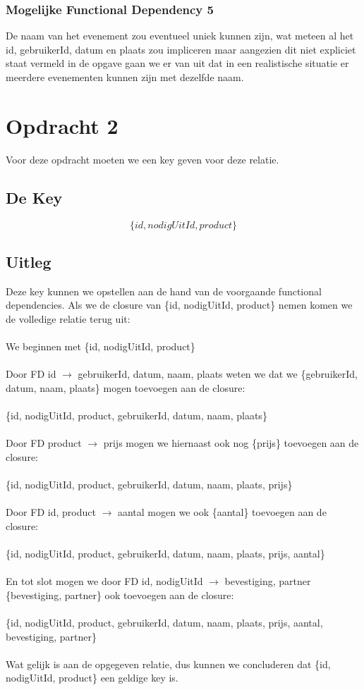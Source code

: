 \documentclass[a4paper]{article}
\begin{document}
\subsubsection{Mogelijke Functional Dependency 5}
De naam van het evenement zou eventueel uniek kunnen zijn, wat meteen al het id, gebruikerId, datum en plaats zou impliceren maar aangezien dit niet expliciet staat vermeld in de opgave gaan we er van uit dat in een realistische situatie er meerdere evenementen kunnen zijn met dezelfde naam.

\section{Opdracht 2}
Voor deze opdracht moeten we een key geven voor deze relatie.
\subsection{De Key}
\[\{id, nodigUitId, product\}\]
\newpage
\subsection{Uitleg}
Deze key kunnen we opstellen aan de hand van de voorgaande functional dependencies.
Als we de closure van \{id, nodigUitId, product\} nemen komen we de volledige relatie terug uit:\\\\
We beginnen met \{id, nodigUitId, product\}\\\\
Door FD id $\rightarrow$ gebruikerId, datum, naam, plaats weten we dat we \{gebruikerId, datum, naam, plaats\} mogen toevoegen aan de closure:\\\\
\{id, nodigUitId, product, gebruikerId, datum, naam, plaats\}\\\\
Door FD product $\rightarrow$ prijs mogen we hiernaast ook nog \{prijs\} toevoegen aan de closure:\\\\
\{id, nodigUitId, product, gebruikerId, datum, naam, plaats, prijs\}\\\\
Door FD id, product $\rightarrow$ aantal mogen we ook \{aantal\} toevoegen aan de closure:\\\\
\{id, nodigUitId, product, gebruikerId, datum, naam, plaats, prijs, aantal\}\\\\
En tot slot mogen we door FD id, nodigUitId $\rightarrow$ bevestiging, partner \{bevestiging, partner\} ook toevoegen aan de closure:\\\\
\{id, nodigUitId, product, gebruikerId, datum, naam, plaats, prijs, aantal, bevestiging, partner\}\\\\
Wat gelijk is aan de opgegeven relatie, dus kunnen we concluderen dat \{id, nodigUitId, product\} een geldige key is.
\end{document}
